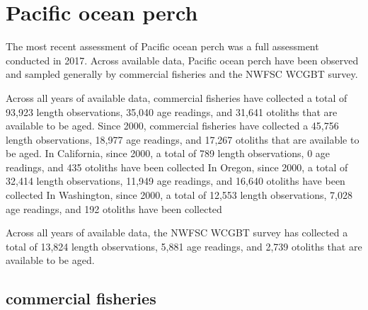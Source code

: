 \documentclass[11pt,
  english,
  letterpaper,
]{article}
\begin{document}

\hypertarget{pacific-ocean-perch}{%
\section{Pacific ocean perch}\label{pacific-ocean-perch}}

\leavevmode\tagmcend\tagstructend


The most recent assessment of Pacific ocean perch was a full assessment conducted in 2017. Across available data, Pacific ocean perch have been observed and sampled generally by commercial fisheries and the NWFSC WCGBT survey.

\leavevmode\tagmcend\tagstructend\par


Across all years of available data, commercial fisheries have collected a total of 93,923 length observations, 35,040 age readings, and 31,641 otoliths that are available to be aged. Since 2000, commercial fisheries have collected a 45,756 length observations, 18,977 age readings, and 17,267 otoliths that are available to be aged. In California, since 2000, a total of 789 length observations, 0 age readings, and 435 otoliths have been collected In Oregon, since 2000, a total of 32,414 length observations, 11,949 age readings, and 16,640 otoliths have been collected In Washington, since 2000, a total of 12,553 length observations, 7,028 age readings, and 192 otoliths have been collected

\leavevmode\tagmcend\tagstructend\par


Across all years of available data, the NWFSC WCGBT survey has collected a total of 13,824 length observations, 5,881 age readings, and 2,739 otoliths that are available to be aged.

\leavevmode\tagmcend\tagstructend\par


\hypertarget{commercial-fisheries-33}{%
\subsection{commercial fisheries}\label{commercial-fisheries-33}}
\end{document}
